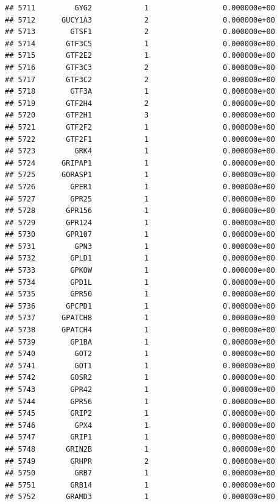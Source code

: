 \documentclass[
]{article}
\begin{document}
\begin{verbatim}
## 5711         GYG2            1                 0.000000e+00
## 5712      GUCY1A3            2                 0.000000e+00
## 5713        GTSF1            2                 0.000000e+00
## 5714       GTF3C5            1                 0.000000e+00
## 5715       GTF2E2            1                 0.000000e+00
## 5716       GTF3C3            2                 0.000000e+00
## 5717       GTF3C2            2                 0.000000e+00
## 5718        GTF3A            1                 0.000000e+00
## 5719       GTF2H4            2                 0.000000e+00
## 5720       GTF2H1            3                 0.000000e+00
## 5721       GTF2F2            1                 0.000000e+00
## 5722       GTF2F1            1                 0.000000e+00
## 5723         GRK4            1                 0.000000e+00
## 5724      GRIPAP1            1                 0.000000e+00
## 5725      GORASP1            1                 0.000000e+00
## 5726        GPER1            1                 0.000000e+00
## 5727        GPR25            1                 0.000000e+00
## 5728       GPR156            1                 0.000000e+00
## 5729       GPR124            1                 0.000000e+00
## 5730       GPR107            1                 0.000000e+00
## 5731         GPN3            1                 0.000000e+00
## 5732        GPLD1            1                 0.000000e+00
## 5733        GPKOW            1                 0.000000e+00
## 5734        GPD1L            1                 0.000000e+00
## 5735        GPR50            1                 0.000000e+00
## 5736       GPCPD1            1                 0.000000e+00
## 5737      GPATCH8            1                 0.000000e+00
## 5738      GPATCH4            1                 0.000000e+00
## 5739        GP1BA            1                 0.000000e+00
## 5740         GOT2            1                 0.000000e+00
## 5741         GOT1            1                 0.000000e+00
## 5742        GOSR2            1                 0.000000e+00
## 5743        GPR42            1                 0.000000e+00
## 5744        GPR56            1                 0.000000e+00
## 5745        GRIP2            1                 0.000000e+00
## 5746         GPX4            1                 0.000000e+00
## 5747        GRIP1            1                 0.000000e+00
## 5748       GRIN2B            1                 0.000000e+00
## 5749        GRHPR            2                 0.000000e+00
## 5750         GRB7            1                 0.000000e+00
## 5751        GRB14            1                 0.000000e+00
## 5752       GRAMD3            1                 0.000000e+00

\end{verbatim}
\end{document}
